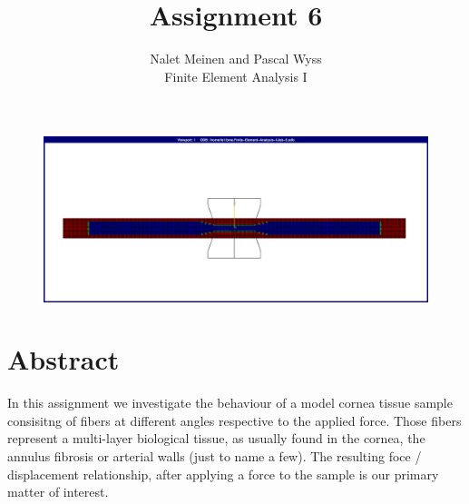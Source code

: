 \documentclass[12pt]{article}
\begin{document}


\title{Assignment 6}%
\author{Nalet Meinen and Pascal Wyss\\ %
Finite Element Analysis I
}
\maketitle

\begin{figure}[!htb]
  \centering
  \vspace*{1cm}
  \includegraphics[trim={2cm 2cm 2cm 2cm},clip,width=1.0\linewidth]{pics/titelbild}
  \label{fig:0}
\end{figure}

\newpage

\section*{Abstract}
In this assignment we investigate the behaviour of a model cornea tissue sample 
consisitng of fibers at different angles
respective to the applied force. Those fibers represent a multi-layer biological
tissue, as usually found in the cornea, the annulus fibrosis or arterial walls (just to name a few).
The resulting foce / displacement relationship, after applying a force to the sample is our primary
matter of interest.

\end{document}
